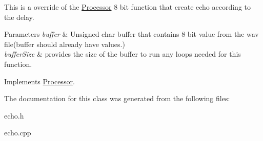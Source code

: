 This is a override of the \hyperlink{classProcessor}{Processor} 8 bit function that create echo according to the delay. 


\begin{DoxyParams}{Parameters}
{\em buffer} & Unsigned char buffer that contains 8 bit value from the wav file(buffer should already have values.) \\
\hline
{\em buffer\+Size} & provides the size of the buffer to run any loops needed for this function. \\
\hline
\end{DoxyParams}


Implements \hyperlink{classProcessor_a5a977cc3596fdeac860d5e28a99806a1}{Processor}.



The documentation for this class was generated from the following files\+:\begin{DoxyCompactItemize}
\item 
echo.\+h\item 
echo.\+cpp\end{DoxyCompactItemize}
